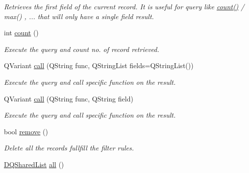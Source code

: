 \begin{DoxyCompactItemize}
\begin{DoxyCompactList}\small\item\em Retrieves the first field of the current record. It is useful for query like \hyperlink{classDQSharedQuery_a371f26bb8cec5fafe81738ecbe899601}{count()} / max() , ... that will only have a single field result. \item\end{DoxyCompactList}\item 
\hypertarget{classDQSharedQuery_a371f26bb8cec5fafe81738ecbe899601}{
int \hyperlink{classDQSharedQuery_a371f26bb8cec5fafe81738ecbe899601}{count} ()}
\label{classDQSharedQuery_a371f26bb8cec5fafe81738ecbe899601}

\begin{DoxyCompactList}\small\item\em Execute the query and count no. of record retrieved. \item\end{DoxyCompactList}\item 
QVariant \hyperlink{classDQSharedQuery_a654c57e67ee37ea4483f749cfdda45ee}{call} (QString func, QStringList fields=QStringList())
\begin{DoxyCompactList}\small\item\em Execute the query and call specific function on the result. \item\end{DoxyCompactList}\item 
QVariant \hyperlink{classDQSharedQuery_a6e4ec97801fba34687bed3f7df331c70}{call} (QString func, QString field)
\begin{DoxyCompactList}\small\item\em Execute the query and call specific function on the result. \item\end{DoxyCompactList}\item 
bool \hyperlink{classDQSharedQuery_afe36230dc5efa50e5ea9456725b5b4b9}{remove} ()
\begin{DoxyCompactList}\small\item\em Delete all the records fullfill the filter rules. \item\end{DoxyCompactList}\item 
\hypertarget{classDQSharedQuery_a5f1f9c78ce1ac9f0416429a14b0f7ed7}{
\hyperlink{classDQSharedList}{DQSharedList} \hyperlink{classDQSharedQuery_a5f1f9c78ce1ac9f0416429a14b0f7ed7}{all} ()}
\label{classDQSharedQuery_a5f1f9c78ce1ac9f0416429a14b0f7ed7}


\end{DoxyCompactItemize}
